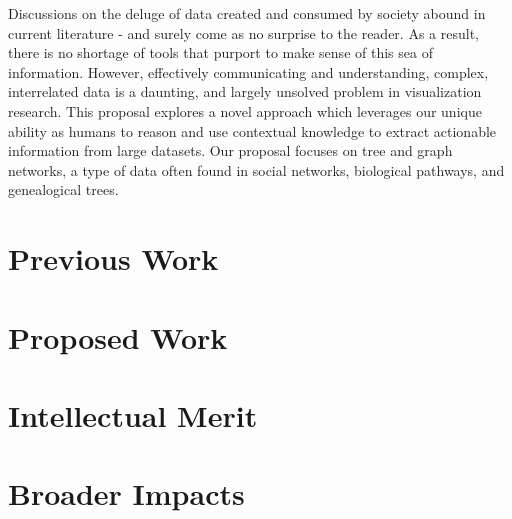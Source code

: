 \documentclass[timesfont,runinheadings]{nsfgrfp}
\begin{document}

 Discussions on the deluge of data created and consumed by society abound in current literature - and surely come as no surprise to the reader. As a result, there is no shortage of tools that purport to make sense of this sea of information. However, effectively communicating and understanding, complex, interrelated data is a daunting, and largely unsolved problem in visualization research. This proposal explores a novel approach which leverages our unique ability as humans to reason and use contextual knowledge to extract actionable information from large datasets. Our proposal focuses on tree and graph networks, a type of data often found in social networks,  biological pathways, and genealogical trees.
 
  

\section*{Previous Work}

\section*{Proposed Work}

\section*{Intellectual Merit}

\section*{Broader Impacts}
\end{document}
